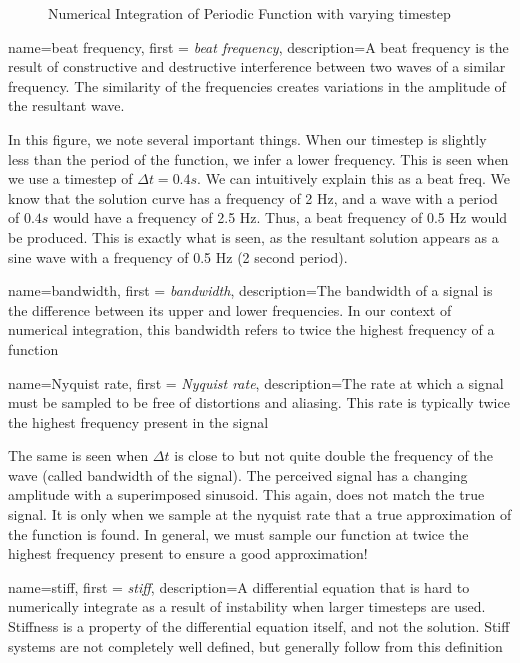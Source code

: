 \documentclass[12pt]{report}
\begin{document}
{\begin{figure}[ht]
    \caption{Numerical Integration of Periodic Function with varying timestep}
    \label{fig:Nyquist}
\end{figure}

{
    name=beat frequency,
    first = {\textit{beat frequency}},
    description={A beat frequency is the result of constructive and destructive interference between two waves of a similar frequency. The similarity of the frequencies creates variations in the amplitude of the resultant wave.}
}

In this figure, we note several important things. When our timestep is slightly less than the period of the function, we infer a lower frequency. This is seen when we use a timestep of $\Delta t=0.4s$. We can intuitively explain this as a \gls{beat freq}. We know that the solution curve has a frequency of 2 Hz, and a wave with a period of $0.4 s$ would have a frequency of 2.5 Hz. Thus, a beat frequency of 0.5 Hz would be produced. This is exactly what is seen, as the resultant solution appears as a sine wave with a frequency of 0.5 Hz (2 second period). 

{
    name=bandwidth,
    first = {\textit{bandwidth}},
    description={The bandwidth of a signal is the difference between its upper and lower frequencies. In our context of numerical integration, this bandwidth refers to twice the highest frequency of a function}
}

{
    name=Nyquist rate,
    first = {\textit{Nyquist rate}},
    description={The rate at which a signal must be sampled to be free of distortions and aliasing. This rate is typically twice the highest frequency present in the signal}
}

The same is seen when $\Delta t$ is close to but not quite double the frequency of the wave (called \gls{bandwidth} of the signal). The perceived signal has a changing amplitude with a superimposed sinusoid. This again, does not match the true signal. It is only when we sample at the \gls{nyquist rate} that a true approximation of the function is found. In general, we must sample our function at twice the highest frequency present to ensure a good approximation!

{
    name=stiff,
    first = {\textit{stiff}},
    description={A differential equation that is hard to numerically integrate as a result of instability when larger timesteps are used. Stiffness is a property of the differential equation itself, and not the solution. Stiff systems are not completely well defined, but generally follow from this definition}
}

}
\end{document}
